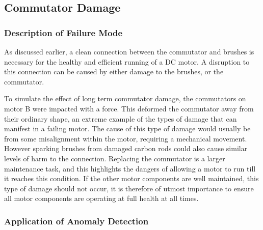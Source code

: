 \subsection{Commutator Damage}

\subsubsection{Description of Failure Mode}

As discussed earlier, a clean connection between the commutator and brushes is necessary for the healthy and efficient running of a DC motor. A disruption to this connection can be caused by either damage to the brushes, or the commutator. 


To simulate the effect of long term commutator damage, the commutators on motor B were impacted with a force. This deformed the commutator away from their ordinary shape, an extreme example of the types of damage that can manifest in a failing motor. The cause of this type of damage would usually be from some misalignment within the motor, requiring a mechanical movement. However sparking brushes from damaged carbon rods could also cause similar levels of harm to the connection. Replacing the commutator is a larger maintenance task, and this highlights the dangers of allowing a motor to run till it reaches this condition. If the other motor components are well maintained, this type of damage should not occur, it is therefore of utmost importance to ensure all motor components are operating at full health at all times.  

\subsubsection{Application of Anomaly Detection}

